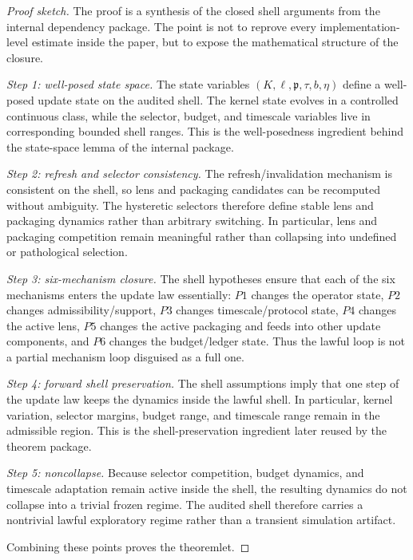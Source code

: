 \documentclass[11pt]{article}
\theoremstyle{definition}
\begin{document}
\begin{proof}[Proof sketch]
The proof is a synthesis of the closed shell arguments from the internal dependency package. The point is not to reprove every implementation-level estimate inside the paper, but to expose the mathematical structure of the closure.

\smallskip
\noindent\emph{Step 1: well-posed state space.}
The state variables \((K,\ell,\mathfrak{p},\tau,b,\eta)\) define a well-posed update state on the audited shell. The kernel state evolves in a controlled continuous class, while the selector, budget, and timescale variables live in corresponding bounded shell ranges. This is the well-posedness ingredient behind the state-space lemma of the internal package.

\smallskip
\noindent\emph{Step 2: refresh and selector consistency.}
The refresh/invalidation mechanism is consistent on the shell, so lens and packaging candidates can be recomputed without ambiguity. The hysteretic selectors therefore define stable lens and packaging dynamics rather than arbitrary switching. In particular, lens and packaging competition remain meaningful rather than collapsing into undefined or pathological selection.

\smallskip
\noindent\emph{Step 3: six-mechanism closure.}
The shell hypotheses ensure that each of the six mechanisms enters the update law essentially:
\(P1\) changes the operator state,
\(P2\) changes admissibility/support,
\(P3\) changes timescale/protocol state,
\(P4\) changes the active lens,
\(P5\) changes the active packaging and feeds into other update components,
and \(P6\) changes the budget/ledger state.
Thus the lawful loop is not a partial mechanism loop disguised as a full one.

\smallskip
\noindent\emph{Step 4: forward shell preservation.}
The shell assumptions imply that one step of the update law keeps the dynamics inside the lawful shell. In particular, kernel variation, selector margins, budget range, and timescale range remain in the admissible region. This is the shell-preservation ingredient later reused by the theorem package.

\smallskip
\noindent\emph{Step 5: noncollapse.}
Because selector competition, budget dynamics, and timescale adaptation remain active inside the shell, the resulting dynamics do not collapse into a trivial frozen regime. The audited shell therefore carries a nontrivial lawful exploratory regime rather than a transient simulation artifact.

Combining these points proves the theoremlet.
\end{proof}
\end{document}

